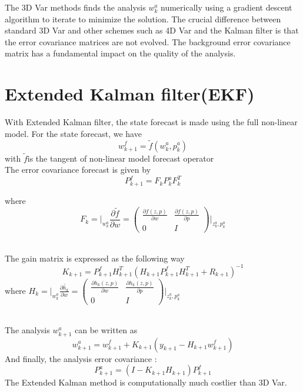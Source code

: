 \documentclass[a4,12pt]{article}
\numberwithin{equation}{section}
\begin{document}
The 3D Var methods finds the analysis $w_k^a$ numerically using a gradient descent algorithm to iterate to minimize the solution.
The crucial difference between standard 3D Var and other schemes such as 4D Var and the Kalman filter is that the error covariance matrices are not evolved. The background error covariance matrix has a fundamental impact on the quality of the analysis.
\section{Extended Kalman filter(EKF)}  
With Extended Kalman filter, the state forecast is made using the full non-linear model.
For the state forecast, we have 
\begin{equation}
w_{k+1}^f = \tilde{f} (w_k^a, p_k^a)
\label{EKFfor}
\end{equation}
with $\tilde{f} $is the tangent of non-linear model forecast operator 
~~\\
The error covariance forecast is given by 
\begin{equation}
P_{k+1}^f = F_k P_k^a F_k^T
\label{CovEKF}
\end{equation}

where 
\begin{equation}
F_k = \big|_{w_k^a} \frac{\partial \tilde{f} }{ \partial w } = 
\begin{pmatrix}
\frac{\partial f(z,p)}{\partial w } & \frac{\partial f(z,p)}{ \partial p}\\
0 & I 
\end{pmatrix}  \big|_{{z_k^a},{ p_k^a}}
\label{EKFF}
\end{equation}

~~\\
The gain matrix is expressed as the following way
\begin{equation}
K_{k+1} = P_{k+1}^f H_{k+1}^T (H_{k+1} P_{k+1}^f H_{k+1}^T + R_{k+1}) ^{-1}
\end{equation}
where  $H_k = \big|_{w_k^a} \frac{\partial \tilde{h_k} }{ \partial w } = 
\begin{pmatrix}
\frac{\partial h_k(z,p)}{\partial w } & \frac{\partial h_k(z,p)}{ \partial p}\\
0 & I 
\end{pmatrix}  \big|_{{z_k^a},{ p_k^a}}$

~~\\
The analysis $w_{k+1}^a$ can be written as 
\begin{equation}
    w_{k+1}^a = w_{k+1}^f + K_{k+1} (y_{k+1} - H_{k+1} w_{k+1}^f)
\end{equation}
And finally, the analysis error covariance :
\begin{equation}
    P_{k+1}^a = (I - K_{k+1} H_{k+1} ) P_{k+1}^f
\end{equation}
The Extended Kalman method is computationally much costlier than 3D Var.  
\end{document}

